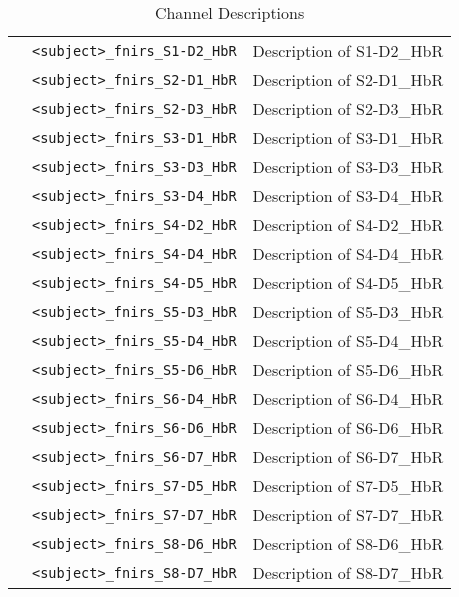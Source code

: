 \begin{table}
\begin{tabularx}{\textwidth}{|l|l|X|}
& \texttt{<subject>\_fnirs\_S1-D2\_HbR} & Description of S1-D2\_HbR \\
& \texttt{<subject>\_fnirs\_S2-D1\_HbR} & Description of S2-D1\_HbR \\
& \texttt{<subject>\_fnirs\_S2-D3\_HbR} & Description of S2-D3\_HbR \\
& \texttt{<subject>\_fnirs\_S3-D1\_HbR} & Description of S3-D1\_HbR \\
& \texttt{<subject>\_fnirs\_S3-D3\_HbR} & Description of S3-D3\_HbR \\
& \texttt{<subject>\_fnirs\_S3-D4\_HbR} & Description of S3-D4\_HbR \\
& \texttt{<subject>\_fnirs\_S4-D2\_HbR} & Description of S4-D2\_HbR \\
& \texttt{<subject>\_fnirs\_S4-D4\_HbR} & Description of S4-D4\_HbR \\
& \texttt{<subject>\_fnirs\_S4-D5\_HbR} & Description of S4-D5\_HbR \\
& \texttt{<subject>\_fnirs\_S5-D3\_HbR} & Description of S5-D3\_HbR \\
& \texttt{<subject>\_fnirs\_S5-D4\_HbR} & Description of S5-D4\_HbR \\
& \texttt{<subject>\_fnirs\_S5-D6\_HbR} & Description of S5-D6\_HbR \\
& \texttt{<subject>\_fnirs\_S6-D4\_HbR} & Description of S6-D4\_HbR \\
& \texttt{<subject>\_fnirs\_S6-D6\_HbR} & Description of S6-D6\_HbR \\
& \texttt{<subject>\_fnirs\_S6-D7\_HbR} & Description of S6-D7\_HbR \\
& \texttt{<subject>\_fnirs\_S7-D5\_HbR} & Description of S7-D5\_HbR \\
& \texttt{<subject>\_fnirs\_S7-D7\_HbR} & Description of S7-D7\_HbR \\
& \texttt{<subject>\_fnirs\_S8-D6\_HbR} & Description of S8-D6\_HbR \\
& \texttt{<subject>\_fnirs\_S8-D7\_HbR} & Description of S8-D7\_HbR \\
\hline
\end{tabularx}
\caption{Channel Descriptions}
\label{tab:fNIRS_channels}
\end{table}
